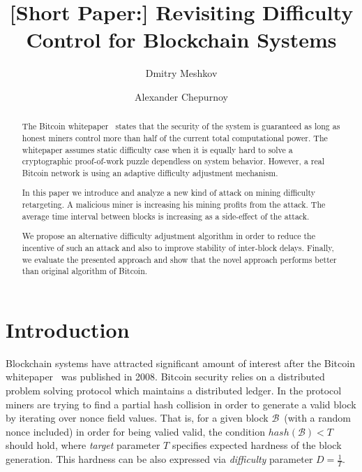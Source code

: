 \documentclass[]{llncs}
\newcommand{\block}{\mathcal{B}}
\begin{document}
\title{[Short Paper:] Revisiting Difficulty Control for Blockchain Systems}


\author{Dmitry Meshkov \and Alexander Chepurnoy}


\maketitle

\begin{abstract}

The Bitcoin whitepaper~\cite{Nakamoto2008} states that the security of the system is guaranteed as long as honest miners control more than half of the current total computational power. The whitepaper assumes static difficulty case when it is equally hard to solve a cryptographic proof-of-work puzzle dependless on system behavior. However, a real Bitcoin network is using an adaptive difficulty adjustment mechanism.  

In this paper we introduce and analyze a new kind of attack on mining difficulty retargeting. A malicious miner is increasing his mining profits from the attack. The average time interval between blocks is increasing as a side-effect of the attack.

We propose an alternative difficulty adjustment algorithm in order to reduce the incentive of such an attack and also to improve stability of inter-block delays. Finally, we evaluate the presented approach and show that the novel approach performs better than original algorithm of Bitcoin.
	
\end{abstract}


\section{Introduction}
\label{sec:intro}

Blockchain systems have attracted significant amount of interest after the Bitcoin whitepaper~\cite{Nakamoto2008} was published in 2008.
Bitcoin security relies on a distributed problem solving protocol which maintains a distributed ledger. In the protocol miners are trying to find a partial hash collision in order to generate a valid block by iterating over nonce field values. That is, for a given block $\block$~(with a random nonce included) in order for being valied valid, the condition $hash(\block) < T$ should hold, where {\em target} parameter $T$ specifies expected hardness of the block generation. This hardness can be also expressed via {\em difficulty} parameter $D = \frac{1}{T}$.
\end{document}
